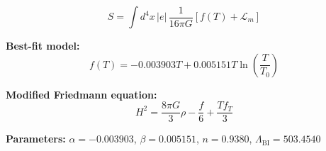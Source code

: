 
\begin{equation}
  S = \int d^4x \, |e| \, \frac{1}{16\pi G} \left[ f(T) + \mathcal{L}_m \right]
\end{equation}

\textbf{Best-fit model:}
\begin{equation}
  f(T) = -0.003903 T + 0.005151 T \ln\!\left(\frac{T}{T_0}\right)
\end{equation}

\textbf{Modified Friedmann equation:}
\begin{equation}
  H^2 = \frac{8\pi G}{3} \rho - \frac{f}{6} + \frac{T f_T}{3}
\end{equation}

\textbf{Parameters:}
$\alpha = -0.003903$, \quad
$\beta = 0.005151$, \quad
$n = 0.9380$, \quad
$\Lambda_{\text{BI}} = 503.4540$